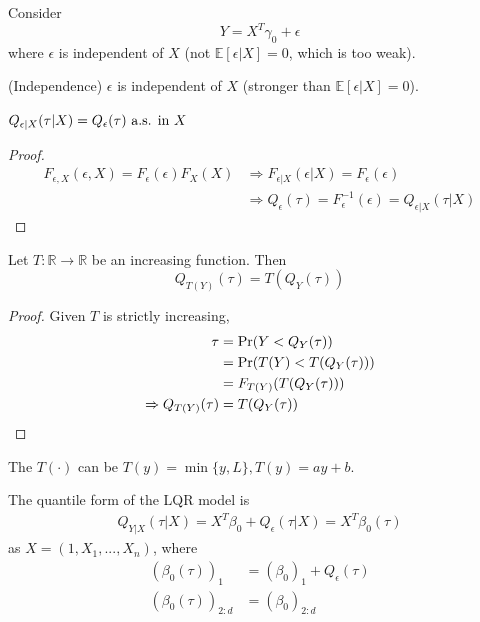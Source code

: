 \documentclass[11pt]{elegantbook}
\begin{document}
Consider $$Y=X^T\gamma_0+\epsilon$$
where $\epsilon$ is independent of $X$ (not $\mathbb{E}[\epsilon|X]=0$, which is too weak).
\begin{assumption} (Independence)
    $\epsilon$ is independent of $X$ (stronger than $\mathbb{E}[\epsilon|X]=0$).
\end{assumption}
\begin{lemma}[By Independence]
    $Q_{\epsilon|X}(\tau|X)=Q_\epsilon(\tau) \textnormal{ a.s. in $X$}$
\end{lemma}
\begin{proof}
    \begin{equation}
        \begin{aligned}
            F_{\epsilon,X}(\epsilon,X)=F_{\epsilon}(\epsilon)F_X(X) &\Rightarrow F_{\epsilon|X}(\epsilon|X)=F_{\epsilon}(\epsilon)\\
            & \Rightarrow Q_{\epsilon}(\tau)=F^{-1}_\epsilon(\epsilon)=Q_{\epsilon|X}(\tau|X)
        \end{aligned}
        \nonumber
    \end{equation}
\end{proof}
\begin{lemma}
    Let $T: \mathbb{R} \rightarrow \mathbb{R}$ be an increasing function. Then $$Q_{T(Y)}(\tau)=T(Q_Y(\tau))$$
\end{lemma}
\begin{proof}
    Given $T$ is strictly increasing,
    \begin{equation}
        \begin{aligned}
            \tau&=\textnormal{Pr}(Y<Q_Y(\tau))\\
            &=\textnormal{Pr}(T(Y)<T(Q_Y(\tau)))\\
            &=F_{T(Y)}(T(Q_Y(\tau)))\\
            \Rightarrow Q_{T(Y)}(\tau)&=T(Q_Y(\tau))
        \end{aligned}
        \nonumber
    \end{equation}
\end{proof}
\begin{example}
    The $T(\cdot)$ can be $T(y)=\min\{y,L\}, T(y)=ay+b$.
\end{example}

The quantile form of the LQR model is
\begin{equation}
    \begin{aligned}
        Q_{Y|X}(\tau|X)=X^T\beta_0+Q_{\epsilon}(\tau|X)=X^T\beta_0(\tau)
    \end{aligned}
    \nonumber
\end{equation}
as $X=(1,X_1,...,X_n)$, where
\begin{equation}
    \begin{aligned}
        (\beta_0(\tau))_1&=(\beta_0)_1+Q_\epsilon(\tau)\\
        (\beta_0(\tau))_{2:d}&=(\beta_0)_{2:d}
    \end{aligned}
    \nonumber
\end{equation}
\end{document}
